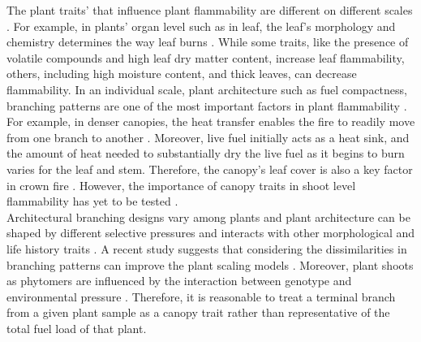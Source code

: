 \documentclass[12pt]{report}
\begin{document}
The plant traits' that influence plant flammability are different on different scales \citep{pausas2017flammability}. For example, in plants' organ level such as in leaf, the leaf's morphology and chemistry determines the way leaf burns \citep{anderson1970forest, owens1998seasonal, schwilk2011scaling, pausas2016secondary, guerrero2021leaf, ganteaume2021volatile,alam2020shoot}. While some traits, like the presence of volatile compounds and high leaf dry matter content, increase leaf flammability, others, including high moisture content, and thick leaves, can decrease flammability. In an individual scale, plant architecture such as fuel compactness, branching patterns are one of the most important factors in plant flammability \citep{schwilk2003flammability, madrigal2012evaluation}. For example, in denser canopies, the heat transfer enables the fire to readily move from one branch to another \citep{bond1996fire}. Moreover, live fuel initially acts as a heat sink, and the amount of heat needed to substantially dry the live fuel as it begins to burn varies for the leaf and stem. Therefore, the canopy's leaf cover is  also a key factor in crown fire \citep{ray2005micrometeorological}. However, the importance of canopy traits in shoot level flammability has yet to be tested \citep{alam2020shoot}.\\





Architectural branching designs vary among plants \citep{halle2012tropical} and plant architecture can be shaped by different selective pressures \citep{danell1994browseeffects, schwilk2003flammability} and interacts with other morphological and life history traits \citep{ackerly1998leaf, schwilk2001flammability,archibald2003growing}. A recent study suggests that considering the dissimilarities in branching patterns can improve the plant scaling models \citep{bentley2013empirical}. Moreover, plant shoots as phytomers are influenced by the interaction between genotype and environmental pressure \citep{mcsteen2005shoot, wang2008molecular}. Therefore, it is reasonable to treat a terminal branch from a given plant sample as a canopy trait rather than representative of the total fuel load of that plant.\\
\end{document}

